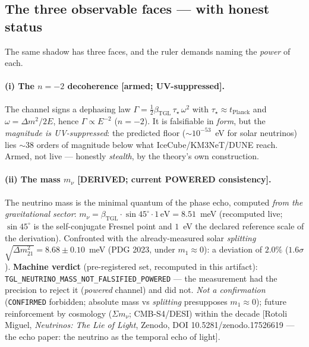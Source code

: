 \documentclass[11pt]{article}
\newcommand{\bTGL}{\beta_{\mathrm{TGL}}}\newcommand{\Msun}{M_{\odot}}\newcommand{\TGL}{\mathrm{TGL}}
\theoremstyle{definition}\newtheorem{deriv}{Derivation}
\begin{document}
\subsection*{The three observable faces --- with honest status}

The same shadow has three faces, and the ruler demands naming the \emph{power} of each.

\paragraph{(i) The $n=-2$ decoherence \textsf{[armed; UV-suppressed].}} The channel signs a dephasing law $\Gamma=\tfrac12\bTGL\,\tau_\star\,\omega^2$ with $\tau_\star\approx t_{\text{Planck}}$ and $\omega=\Delta m^2/2E$, hence $\Gamma\propto E^{-2}$ ($n=-2$). It is falsifiable in \emph{form}, but the \emph{magnitude is UV-suppressed}: the predicted floor ($\sim10^{-53}$~eV for solar neutrinos) lies $\sim38$ orders of magnitude below what IceCube/KM3NeT/DUNE reach. Armed, not live --- honestly \emph{stealth}, by the theory's own construction.

\paragraph{(ii) The mass $m_\nu$ \textsf{[DERIVED; current POWERED consistency].}} The neutrino mass is the minimal quantum of the phase echo, computed \emph{from the gravitational sector}: $m_\nu=\bTGL\cdot\sin45^\circ\cdot1\,\text{eV}=8.51$~meV (recomputed live; $\sin45^\circ$ is the self-conjugate Fresnel point and $1$~eV the declared reference scale of the derivation). Confronted with the already-measured solar \emph{splitting} $\sqrt{\Delta m^2_{21}}=8.68\pm0.10$~meV (PDG 2023, under $m_1\!\approx\!0$): a deviation of $2.0\%$ ($1.6\sigma$). \textbf{Machine verdict} (pre-registered set, recomputed in this artifact): \texttt{TGL\_NEUTRINO\_MASS\_NOT\_FALSIFIED\_POWERED} --- the measurement had the precision to reject it (\emph{powered} channel) and did not. \emph{Not a confirmation} (\texttt{CONFIRMED} forbidden; absolute mass vs \emph{splitting} presupposes $m_1\!\approx\!0$); future reinforcement by cosmology ($\Sigma m_\nu$; CMB-S4/DESI) within the decade [Rotoli Miguel, \emph{Neutrinos: The Lie of Light}, Zenodo, DOI 10.5281/zenodo.17526619 --- the echo paper: the neutrino as the temporal echo of light].
\end{document}
